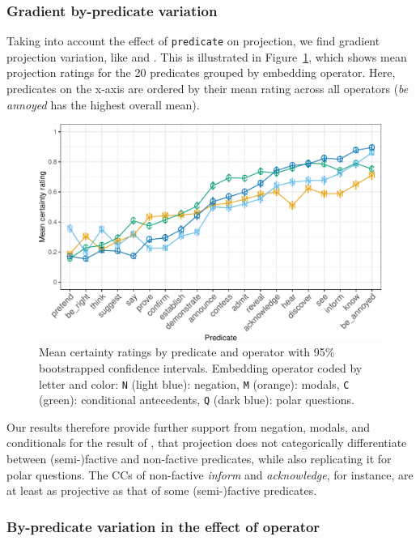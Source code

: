 \documentclass[a4paper,12pt,twoside]{article}
\begin{document}
		\subsubsection{Gradient by-predicate variation}

			Taking into account the effect of \texttt{predicate} on projection, we find gradient projection variation, like \citet{tonhauser_how_2018} and \citet{degen_are_2022}.
			This is illustrated in Figure~\ref{fig:op-pred-ratings}, which shows mean projection ratings for the 20 predicates grouped by embedding operator. Here, predicates on the x-axis are ordered by their mean rating across all operators (\emph{be annoyed} has the highest overall mean).

			\begin{figure}[ht]
				\centering
				\includegraphics[width = \linewidth]{predicate-operator-graph-1}
				\caption{Mean certainty ratings by predicate and operator with 95\% bootstrapped confidence intervals. Embedding operator coded by letter and color:  \texttt{N} (light blue): negation, \texttt{M} (orange): modals, \texttt{C} (green): conditional antecedents, \texttt{Q} (dark blue): polar questions.}
				\label{fig:op-pred-ratings}
			\end{figure}

			Our results therefore provide further support from negation, modals, and conditionals for the result of \citet{degen_are_2022}, that projection does not categorically differentiate between (semi-)factive and non-factive predicates, while also replicating it for polar questions. The CCs of non-factive \emph{inform} and \emph{acknowledge}, for instance, are at least as projective as that of some (semi-)factive predicates.

		\subsubsection{By-predicate variation in the effect of operator}
\end{document}
